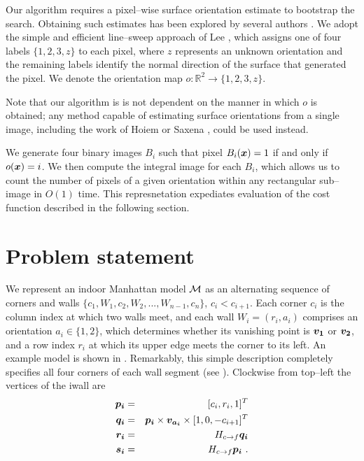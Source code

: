 Our algorithm requires a pixel--wise surface orientation estimate to
bootstrap the search. Obtaining such estimates has been explored by
several authors \cite{Lee09,Hoiem05,Saxena09}. We adopt the simple and
efficient line--sweep approach of Lee \etal \cite{Lee09}, which
assigns one of four labels $\{1,2,3,z\}$ to each pixel, where $z$
represents an unknown orientation and the remaining labels identify
the normal direction of the surface that generated the pixel. We
denote the orientation map $o:\mathbb{R}^2\rightarrow \{1,2,3,z\}$.

Note that our algorithm is is not dependent on the manner in which $o$
is obtained; any method capable of estimating surface orientations
from a single image, including the work of Hoiem \cite{Hoiem05} or
Saxena \cite{Saxena09}, could be used instead.

We generate four binary images $B_i$ such that pixel $B_i(\boldsymbol{x})=1$
if and only if $o(\boldsymbol{x})=i$. We then compute the integral image
\cite{Viola01} for each $B_i$, which allows us to count the number of
pixels of a given orientation within any rectangular sub--image in
$O(1)$ time. This represnetation expediates evaluation of the cost
function described in the following section.

\section{Problem statement}
\label{sect:probstmt}

We represent an indoor Manhattan model $\mathcal{M}$ as an alternating
sequence of corners and walls $\{c_1,W_1,c_2,W_2,...,W_{n-1},c_n\}$,
$c_i < c_{i+1}$. Each corner $c_i$ is the column index at which two
walls meet, and each wall $W_i=(r_i,a_i)$ comprises an orientation
$a_i\in\{1,2\}$, which determines whether its vanishing point is
$\boldsymbol{v_1}$ or $\boldsymbol{v_2}$, and a row index $r_i$ at which its upper
edge meets the corner to its left. An example model is shown in
. Remarkably, this simple description completely
specifies all four corners of each wall segment (see
). Clockwise from top--left the vertices of the i\th wall
are
\begin{eqnarray}
  \boldsymbol{p_i} &=& [c_i,r_i,1]^T \\
  \boldsymbol{q_i} &=& \boldsymbol{p_i} \times \boldsymbol{v_{a_i}} \times
       [1,0,-c_{i+1}]^T \\
  \boldsymbol{r_i} &=& H_{c \rightarrow f} \boldsymbol{q_i} \\
  \boldsymbol{s_i} &=& H_{c \rightarrow f} \boldsymbol{p_i} ~.
\end{eqnarray}

